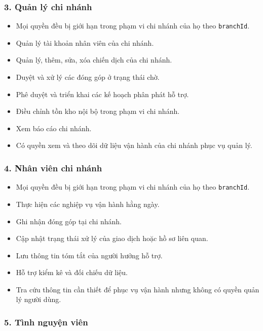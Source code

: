 \documentclass[12pt,a4paper]{article}
\begin{document}
\subsubsection*{3. Quản lý chi nhánh}

\begin{itemize}
    \item Mọi quyền đều bị giới hạn trong phạm vi chi nhánh của họ theo \texttt{branchId}.
    \item Quản lý tài khoản nhân viên của chi nhánh.
    \item Quản lý, thêm, sửa, xóa chiến dịch của chi nhánh.
    \item Duyệt và xử lý các đóng góp ở trạng thái chờ.
    \item Phê duyệt và triển khai các kế hoạch phân phát hỗ trợ.
    \item Điều chỉnh tồn kho nội bộ trong phạm vi chi nhánh.
    \item Xem báo cáo chi nhánh.
    \item Có quyền xem và theo dõi dữ liệu vận hành của chi nhánh phục vụ quản lý.
\end{itemize}

\subsubsection*{4. Nhân viên chi nhánh}

\begin{itemize}
    \item Mọi quyền đều bị giới hạn trong phạm vi chi nhánh của họ theo \texttt{branchId}.
    \item Thực hiện các nghiệp vụ vận hành hằng ngày.
    \item Ghi nhận đóng góp tại chi nhánh.
    \item Cập nhật trạng thái xử lý của giao dịch hoặc hồ sơ liên quan.
    \item Lưu thông tin tóm tắt của người hưởng hỗ trợ.
    \item Hỗ trợ kiểm kê và đối chiếu dữ liệu.
    \item Tra cứu thông tin cần thiết để phục vụ vận hành nhưng không có quyền quản lý người dùng.
\end{itemize}

\subsubsection*{5. Tình nguyện viên}
\end{document}
